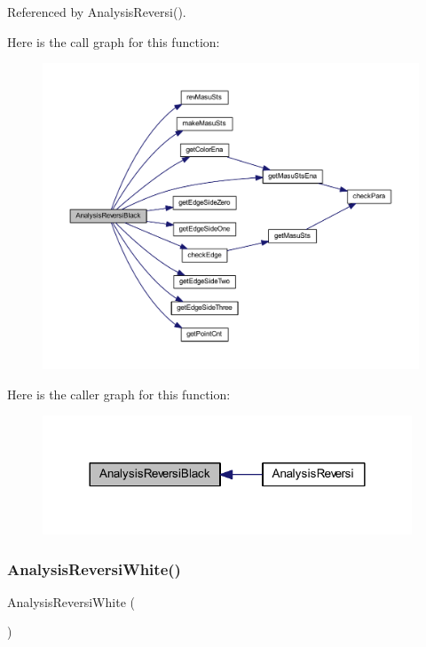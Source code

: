 Referenced by Analysis\+Reversi().

Here is the call graph for this function\+:\nopagebreak
\begin{figure}[H]
\begin{center}
\leavevmode
\includegraphics[width=350pt]{class_reversi_a471972ec549188f7eb701d57e14ae7a1_cgraph}
\end{center}
\end{figure}
Here is the caller graph for this function\+:\nopagebreak
\begin{figure}[H]
\begin{center}
\leavevmode
\includegraphics[width=312pt]{class_reversi_a471972ec549188f7eb701d57e14ae7a1_icgraph}
\end{center}
\end{figure}
\mbox{\label{class_reversi_a3c30afb2509b0782b1c22a8770c68c48}} 
\subsubsection{\texorpdfstring{Analysis\+Reversi\+White()}{AnalysisReversiWhite()}}
{\footnotesize\ttfamily Analysis\+Reversi\+White (\begin{DoxyParamCaption}{ }\end{DoxyParamCaption})\hspace{0.3cm}{\ttfamily [private]}}



